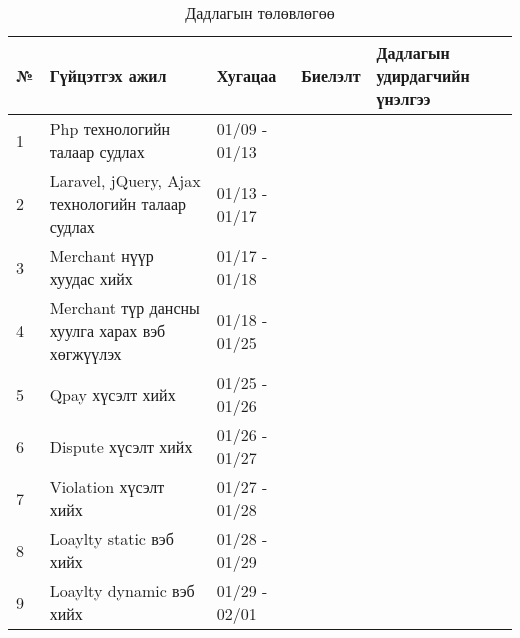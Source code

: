 \begin{table}[h]
\caption{Дадлагын төлөвлөгөө}
\begin{tabular}{|p{0.5cm}|p{8cm}|l|l|p{3cm}|}
\hline
\textbf{№} & \textbf{Гүйцэтгэх ажил} & \textbf{Хугацаа} & \textbf{Биелэлт} & \textbf{Дадлагын удирдагчийн үнэлгээ} \\ \hline
1 & Php технологийн талаар судлах & 01/09 - 01/13 && \\ \hline
2 & Laravel, jQuery, Ajax технологийн талаар судлах & 01/13 - 01/17 && \\ \hline
3 & Merchant нүүр хуудас хийх & 01/17 - 01/18 && \\ \hline
4 & Merchant түр дансны хуулга харах вэб хөгжүүлэх & 01/18 - 01/25 && \\ \hline
5 & Qpay хүсэлт хийх & 01/25 - 01/26 && \\ \hline
6 & Dispute хүсэлт хийх & 01/26 - 01/27 && \\ \hline
7 & Violation хүсэлт хийх & 01/27 - 01/28 && \\ \hline
8 & Loaylty static вэб хийх & 01/28 - 01/29 &&  \\ \hline
9 & Loaylty dynamic вэб хийх & 01/29 - 02/01 && \\ \hline
\end{tabular}
\end{table}
